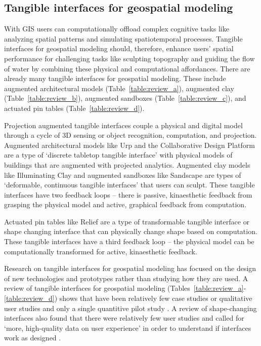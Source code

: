 \documentclass[prodmode,acmtochi]{acmsmall} %
\begin{document}
\subsection{Tangible interfaces for geospatial modeling} 

With GIS users can computationally offload complex cognitive tasks 
like analyzing spatial patterns and simulating spatiotemporal processes.
%
Tangible interfaces for geospatial modeling should, 
therefore, enhance users' spatial performance 
for challenging tasks 
like sculpting topography and guiding the flow of water
by combining these physical and computational affordances.
%
There are already many tangible interfaces for geospatial modeling.
%
These include 
augmented architectural models (Table~\ref{table:review_a}), 
augmented clay (Table~\ref{table:review_b}),  
augmented sandboxes (Table~\ref{table:review_c}), 
and actuated pin tables (Table~\ref{table:review_d}).

Projection augmented tangible interfaces 
couple a physical and digital model
through a cycle of 3D sensing or object recognition,
computation, and projection. 
%
Augmented architectural models
like Urp \cite{Underkoffler1999} 
and the Collaborative Design Platform \cite{Schubert2011}
are a type of 
`discrete tabletop tangible interface' \cite{Ishii2012}
with physical models of buildings 
that are augmented with projected analytics.
%
Augmented clay models 
like Illuminating Clay \cite{Piper2002a} 
and augmented sandboxes like Sandscape \cite{Ishii2004} 
are types of 
`deformable, continuous tangible interfaces' \cite{Ishii2012}
that users can sculpt. 
%
These tangible interfaces 
have two feedback loops -- 
there is passive, kinaesthetic feedback from grasping the physical model 
and active, graphical feedback from computation.

Actuated pin tables
like Relief \cite{Leithinger2009}
are a type of transformable tangible interface \cite{Ishii2012} 
or shape changing interface \cite{Rasmussen2012}
that can physically change shape based on computation.
%
These tangible interfaces 
have a third feedback loop --
the physical model
can be computationally transformed
for active, kinaesthetic feedback. 

Research on tangible interfaces for geospatial modeling 
has focused on the design of new technologies and prototypes
rather than studying how they
are used. 
%
A review of tangible interfaces for geospatial modeling 
(Tables~\ref{table:review_a}-\ref{table:review_d})
shows that have been 
relatively few case studies \cite{Ishii2002,Tateosian2010,Petrasova2015} 
or qualitative user studies \cite{Shamonsky2003}
and only a single quantitive pilot study \cite{Harmon2016}.
%
A review of shape-changing interfaces 
also found that there were relatively few user studies
and called for `more, high-quality data on user experience'
in order to understand if interfaces work as designed
\cite{Rasmussen2012}.
\end{document}
